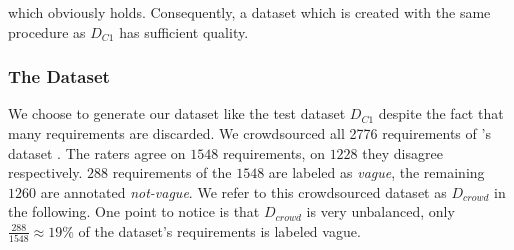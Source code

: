 which obviously holds.
Consequently, a dataset which is created with the same procedure as $D_{C1}$ has sufficient quality.

\subsubsection{The Dataset}
We choose to generate our dataset like the test dataset $D_{C1}$ despite the fact that many requirements are discarded.
We crowdsourced all 2776 requirements of \citeauthor{Kummeth:2020}'s dataset \parencite{Kummeth:2020}.
The raters agree on $1548$ requirements, on $1228$ they disagree respectively.
$288$ requirements of the $1548$ are labeled as \textit{vague}, the remaining $1260$ are annotated \textit{not-vague}.
We refer to this crowdsourced dataset as $D_{crowd}$ in the following.
One point to notice is that $D_{crowd}$ is very unbalanced, only $\frac{288}{1548} \approx 19\%$ of the dataset's requirements is labeled vague.
